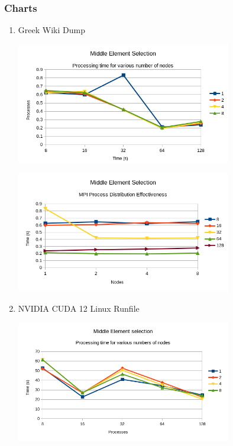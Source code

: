\documentclass[11pt]{article}
\begin{document}
\subsubsection{Charts}
\label{sec:orge6f1060}
\begin{enumerate}
\item Greek Wiki Dump
\label{sec:org8c3bb82}
\begin{center}
\includegraphics[height=200]{./charts/greek-wiki-dump/processing-time-nodes.png}
\end{center}
\begin{center}
\includegraphics[height=200]{./charts/greek-wiki-dump/process-distribution-effectiveness.png}
\end{center}
\pagebreak
\item NVIDIA CUDA 12 Linux Runfile
\label{sec:org5bdecd4}
\begin{center}
\includegraphics[height=200]{./charts/cuda-12-runfile/processing-time-nodes.png}

\end{center}
\end{enumerate}
\end{document}
